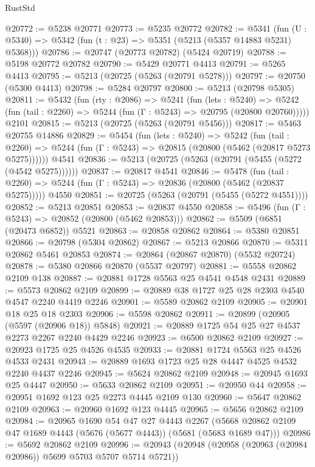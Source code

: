 \begin{lexlean}{RustStd}
\begin{coremodule}
@20772 := @5238 @20771
@20773 := @5235 @20772
@20782 := @5341
    (fun (U : @5340) => @5342 (fun (t : @23) => @5351 (@5213 (@5357 @14883 @5231) @5368)))
@20786 := @20747 (@20773 @20782) (@5424 @20719)
@20788 := @5198 @20772 @20782
@20790 := @5429 @20771 @4413
@20791 := @5265 @4413
@20795 := @5213 (@20725 (@5263 (@20791 @5278)))
@20797 := @20750 (@5300 @4413)
@20798 := @5284 @20797
@20800 := @5213 (@20798 @5305)
@20811 := @5432
    (fun (rty : @2086) =>
    @5241
      (fun (lets : @5240) =>
      @5242 (fun (tail : @2260) => @5244 (fun (Γ : @5243) => @20795 (@20800 @20760)))))
    @2101
@20815 := @5213 (@20725 (@5263 (@20791 @5456)))
@20817 := @5463 @20755 @14886
@20829 := @5454
    (fun (lets : @5240) =>
    @5242
      (fun (tail : @2260) =>
      @5244 (fun (Γ : @5243) => @20815 (@20800 (@5462 (@20817 @5273 @5275))))))
    @4541
@20836 := @5213 (@20725 (@5263 (@20791 (@5455 (@5272 (@4542 @5275))))))
@20837 := @20817 @4541
@20846 := @5478
    (fun (tail : @2260) => @5244 (fun (Γ : @5243) => @20836 (@20800 (@5462 (@20837 @5275)))))
    @4550
@20851 := @20725 (@5263 (@20791 (@5455 (@5272 @4551))))
@20852 := @5213 @20851
@20853 := @20837 @4550
@20858 := @5496 (fun (Γ : @5243) => @20852 (@20800 (@5462 @20853)))
@20862 := @5509 (@6851 (@20473 @6852)) @5521
@20863 := @20858 @20862
@20864 := @5380 @20851
@20866 := @20798 (@5304 @20862)
@20867 := @5213 @20866
@20870 := @5311 @20862 @5461 @20853
@20874 := @20864 (@20867 @20870) (@5532 @20724)
@20878 := @5380 @20866 @20870 (@5537 @20797)
@20881 := @5558 @20862 @2109 @138
@20887 := @20881 @1728 @5563 @25 @4541 @4548 @2431
@20889 := @5573 @20862 @2109
@20899 := @20889 @38 @1727 @25 @28 @2303 @4540 @4547 @2240 @4419 @2246
@20901 := @5589 @20862 @2109
@20905 := @20901 @18 @25 @18 @2303
@20906 := @5598 @20862
@20911 := @20899 (@20905 (@5597 (@20906 @18)) @5848)
@20921 := @20889 @1725 @54 @25 @27 @4537 @2273 @2267 @2240 @4429 @2246
@20923 := @6500 @20862 @2109
@20927 := @20923 @1725 @25 @4526 @4535
@20933 := @20881 @1724 @5563 @25 @4526 @4533 @2431
@20943 := @20889 @1693 @1723 @25 @28 @4447 @4525 @4532 @2240 @4437 @2246
@20945 := @5624 @20862 @2109
@20948 := @20945 @1693 @25 @4447
@20950 := @5633 @20862 @2109
@20951 := @20950 @44
@20958 := @20951 @1692 @123 @25 @2273 @4445 @2109 @130
@20960 := @5647 @20862 @2109
@20963 := @20960 @1692 @123 @4445
@20965 := @5656 @20862 @2109
@20984 := @20965
    @1690
    @54
    @47
    @27
    @4443
    @2267
    (@5668 @20862 @2109 @47 @1689 @4443 (@5676 (@5677 @4443)) (@5681 (@5683 @1689 @47)))
@20986 := @5692 @20862 @2109
@20996 := @20943 (@20948 (@20958 (@20963 (@20984 @20986)) @5699 @5703 @5707 @5714 @5721))

\end{coremodule}
\end{lexlean}
